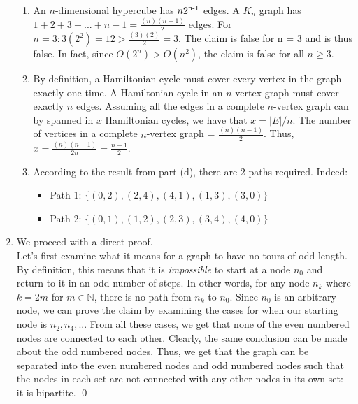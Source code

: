 \documentclass[a4paper]{article}
\newcommand{\N}{\mathbb{N}}
\newcommand{\<}{\langle}
\renewcommand{\>}{\rangle}
\renewcommand{\^}{\wedge}
\begin{document}
\begin{enumerate}
\begin{enumerate}
            \item An $n$-dimensional hypercube has $n2\textsuperscript{n-1}$ edges. A $K_n$ graph has $1 + 2 + 3 + ... + n-1 = \frac{(n)(n-1)}{2}$ edges. For $n = 3: 3(2^2) = 12 > \frac{(3)(2)}{2} = 3$. The claim is false for n = 3 and is thus false. In fact, since $O(2^n) > O(n^2)$, the claim is false for all $n \geq 3$.
            
            \item By definition, a Hamiltonian cycle must cover every vertex in the graph exactly one time. A Hamiltonian cycle in an $n$-vertex graph must cover exactly $n$ edges. Assuming all the edges in a complete $n$-vertex graph can by spanned in $x$ Hamiltonian cycles, we have that $x = |E|/n$. The number of vertices in a complete $n$-vertex graph = $\frac{(n)(n-1)}{2}$. Thus, $x = \frac{(n)(n-1)}{2n} = \frac{n-1}{2}$.
            
            \item According to the result from part (d), there are 2 paths required. Indeed:
                \begin{itemize}
                    \item Path 1: $\{(0,2), (2,4), (4,1), (1,3), (3,0)\}$
                    \item Path 2: $\{(0,1), (1,2), (2,3), (3,4), (4,0)\}$
                \end{itemize}
        \end{enumerate}
        
    \item We proceed with a direct proof.\\
    Let's first examine what it means for a graph to have no tours of odd length. By definition, this means that it is \textit{impossible} to start at a node $n_0$ and return to it in an odd number of steps. In other words, for any node $n_k$ where $k = 2m$ for $m \in \N$, there is no path from $n_k$ to $n_0$. Since $n_0$ is an arbitrary node, we can prove the claim by examining the cases for when our starting node is $n_2, n_4, ...$ From all these cases, we get that none of the even numbered nodes are connected to each other. Clearly, the same conclusion can be made about the odd numbered nodes. Thus, we get that the graph can be separated into the even numbered nodes and odd numbered nodes such that the nodes in each set are not connected with any other nodes in its own set: it is bipartite. \qed


\end{enumerate}
\end{document}
